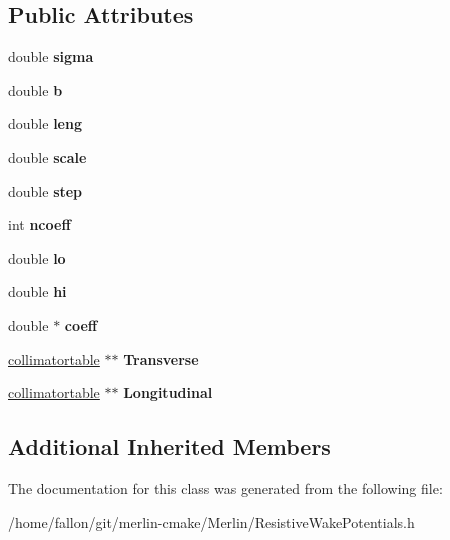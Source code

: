 \subsection*{Public Attributes}
\begin{DoxyCompactItemize}
\item 
\mbox{\label{classResistivePotential_a7c55569d4239d5b16aa53b1ee9a28dca}} 
double {\bfseries sigma}
\item 
\mbox{\label{classResistivePotential_aae79d42717ba750f107281868e3f0c87}} 
double {\bfseries b}
\item 
\mbox{\label{classResistivePotential_a61372d3a691ebd79ca09301abf6124f1}} 
double {\bfseries leng}
\item 
\mbox{\label{classResistivePotential_abd97956cae72f02ea79cc3fe6449af02}} 
double {\bfseries scale}
\item 
\mbox{\label{classResistivePotential_aef51358d4d2e9f7ec89fadb2126b2947}} 
double {\bfseries step}
\item 
\mbox{\label{classResistivePotential_a8adcb17a5975261614ec323a540d3765}} 
int {\bfseries ncoeff}
\item 
\mbox{\label{classResistivePotential_ad12c4441e8b243271e82f076d8b08836}} 
double {\bfseries lo}
\item 
\mbox{\label{classResistivePotential_a82a4efbd4b7b9ea310ec30ced674c61c}} 
double {\bfseries hi}
\item 
\mbox{\label{classResistivePotential_a83dfcaff4d4cb1fc5cef8a2aeb1d57bb}} 
double $\ast$ {\bfseries coeff}
\item 
\mbox{\label{classResistivePotential_a22a43a1d102ef3e2afc44904464ebb74}} 
\hyperlink{classcollimatortable}{collimatortable} $\ast$$\ast$ {\bfseries Transverse}
\item 
\mbox{\label{classResistivePotential_abd59e168822d5c479a29d77dd2bf9029}} 
\hyperlink{classcollimatortable}{collimatortable} $\ast$$\ast$ {\bfseries Longitudinal}
\end{DoxyCompactItemize}
\subsection*{Additional Inherited Members}


The documentation for this class was generated from the following file\+:\begin{DoxyCompactItemize}
\item 
/home/fallon/git/merlin-\/cmake/\+Merlin/Resistive\+Wake\+Potentials.\+h\end{DoxyCompactItemize}
